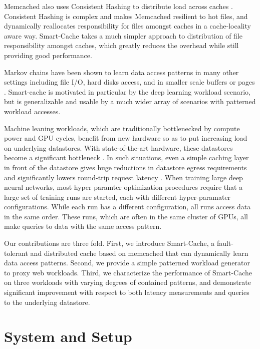 \documentclass[sigconf]{acmart}
\begin{document}
Memcached also uses Consistent Hashing to distribute load across caches \cite{ConsistentHash}. Consistent Hashing is complex and makes Memcached resilient to hot files, and dynamically reallocates responsibility for files amongst caches in a cache-locality aware way. Smart-Cache takes a much simpler approach to distribution of file responsibility amongst caches, which greatly reduces the overhead while still providing good performance.

Markov chains have been shown to learn data access patterns in many other settings including file I/O, hard disks access, and in smaller scale buffers or pages \cite{Lynx, MarkovPredictors, TaP}. Smart-cache is motivated in particular by the deep learning workload scenario, but is generalizable and usable by a much wider array of scenarios with patterned workload accesses.

Machine leaning workloads, which are traditionally bottlenecked by compute power and GPU cycles, benefit from new hardware so as to put increasing load on underlying datastores. With state-of-the-art hardware, these datastores become a significant bottleneck \cite{kahn2020scaling}. In such situations, even a simple caching layer in front of the datastore gives huge reductions in datastore egress requirements and significantly lowers round-trip request latency \cite{kahn2020scaling}. When training large deep neural networks, most hyper paramter optimization procedures require that a large set of training runs are started, each with different hyper-paramater configurations. While each run has a different configuration, all runs access data in the same order. These runs, which are often in the same cluster of GPUs, all make queries to data with the same access pattern.

Our contributions are three fold. First, we introduce Smart-Cache, a fault-tolerant and distributed cache based on memcached \cite{fitzpatrick2004distributed} that can dynamically learn data access patterns. Second, we provide a simple patterned workload generator to proxy web workloads. Third, we characterize the performance of Smart-Cache on three workloads with varying degrees of contained patterns, and demonstrate significant improvement with respect to both latency measurements and queries to the underlying datastore.

\section{System and Setup}
\label{sec:system}
\end{document}

